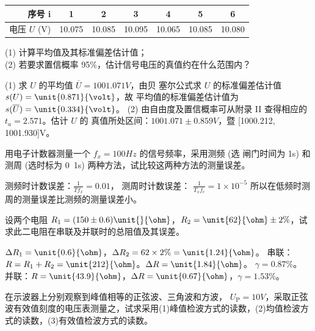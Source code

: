 \documentclass[a4paper,12pt]{examdesign}
\begin{document}
\begin{shortanswer}[title={二、计算题 (每题 10 分，共 80 分)}]
\begin{question}
\begin{table}[H]
\begin{tabular}{|r|c|c|c|c|c|c|}
    \hline
    序号 i &1 &2 &3 &4 &5 &6 \\ \hline
    电压 $U$ (V) &10.075 &10.085 &10.095 &10.065 &10.085 &10.080 \\
    \hline
\end{tabular}
\end{table}
(1) 计算平均值及其标准偏差估计值； \\
(2) 若要求置信概率 95\%，估计信号电压的真值约在什么范围内？
    \examvspace*{7cm}
    \begin{answer}
        (1) 求 $U$ 的平均值 $\overline{U} = \unit{1001.071}{V}$，由贝
        塞尔公式求 $U$ 的标准偏差估计值 $s(U) = \unit{0.871}{\volt}$，故
        平均值的标准偏差估计值为 $s(\overline{U}) = \unit{0.334}{\volt}$。
       (2) 由自由度及置信概率可从附录 II 查得相应的 $t_a = 2.571$。估计 $U$ 的
       真值所处区间：$1001.071 \pm 0.859 \unit{}{V}$，暨 [1000.212, 1001.930]\unit{}{V}。
    \end{answer}
\end{question}
\begin{question}
    用电子计数器测量一个 $f_x = \unit{100}{Hz}$ 的信号频率，采用测频 (选
    闸门时间为 \unit{1}{s}) 和测周 (选时标为 \unit{0.1}{\micro s}) 两种方法，试比较这两种方法的测量误差。
    \examvspace*{4cm}
    \begin{answer}
        测频时计数误差：$\frac{1}{T f_x} = 0.01$， 测周时计数误差：
        $\frac{1}{T_x f_c} = 1 \times 10^{-5}$
        所以在低频时测周的测量误差比测频的测量误差小。
    \end{answer}
\end{question}
\begin{question}
    设两个电阻 $R_1 = (150\pm0.6)\unit{}{\ohm}$，$R_2 =
    \unit{62}{\ohm}\pm 2\%$，试求此二电阻在串联及并联时的总阻值及其误差。
    \examvspace*{10cm}
    \begin{answer}
        $\Delta R_1=\unit{0.6}{\ohm}$，$\Delta R_2=62\times
        2\%=\unit{1.24}{\ohm}$。
        串联：$R= R_1+R_2=\unit{212}{\ohm}$。$\Delta R = \unit{1.84}{\ohm}$。
        $\gamma = 0.87\%$。
        并联：$R = \unit{43.9}{\ohm}$，$\Delta R = \unit{0.67}{\ohm}$，$\gamma
        = 1.53\%$。
    \end{answer}
\end{question}
\begin{question}
    在示波器上分别观察到峰值相等的正弦波、三角波和方波，
    $U_\mathrm{P}=\unit{10}{V}$，采取正弦波有效值刻度的电压表测量之，试求采用(1)峰值检波方式的读数，(2)均值检波方式的读数，(3)有效值检波方式的读数。
    \examvspace*{10cm}
    \begin{answer}

\end{answer}
\end{question}
\end{shortanswer}
\end{document}
